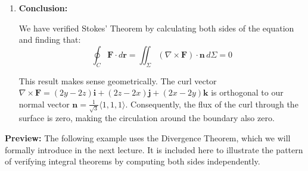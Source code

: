 \begin{example}
\begin{solution}
\begin{enumerate}
    For the last integral:
    \begin{align*}
    \int_0^{2\pi} (\sin t - \cos t)\,dt &= \left[-\cos t - \sin t\right]_0^{2\pi} \\
    &= (-\cos(2\pi) - \sin(2\pi)) - (-\cos(0) - \sin(0)) \\
    &= (-1 - 0) - (-1 - 0) = 0
    \end{align*}
    
    For the first two integrals, when expanded, they contain terms with $\sin t$, $\cos t$, $\sin^2 t \sin t$, $\cos^2 t \cos t$, etc. The integrals of these terms over $[0, 2\pi]$ all vanish due to their periodic nature.
    
    Therefore, the direct calculation confirms:
    \[
    \oint_C \mathbf{F} \cdot d\mathbf{r} = 0
    \]
    
    \item \textbf{Conclusion:} 
    
    We have verified Stokes' Theorem by calculating both sides of the equation and finding that:
    \[
    \oint_C \mathbf{F} \cdot d\mathbf{r} = \iint_\Sigma (\nabla \times \mathbf{F}) \cdot \mathbf{n}\,d\Sigma = 0
    \]
    
    This result makes sense geometrically. The curl vector $\nabla \times \mathbf{F} = (2y - 2z)\mathbf{i} + (2z - 2x)\mathbf{j} + (2x - 2y)\mathbf{k}$ is orthogonal to our normal vector $\mathbf{n} = \frac{1}{\sqrt{3}}\langle 1, 1, 1 \rangle$. Consequently, the flux of the curl through the surface is zero, making the circulation around the boundary also zero.
\end{enumerate}
\end{solution}
\end{example}
\exampleline
\noindent \textbf{Preview:} The following example uses the Divergence Theorem, which we will formally introduce in the next lecture. It is included here to illustrate the pattern of verifying integral theorems by computing both sides independently.\\ \\
